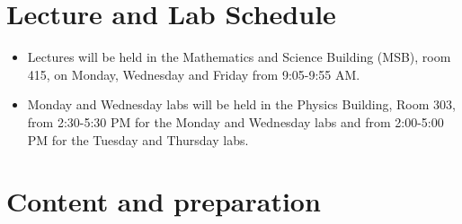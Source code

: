 \documentclass{revtex4}
\begin{document}
\section{Lecture and Lab Schedule}

\begin{itemize}
\item
Lectures will be held in the Mathematics and Science Building (MSB), room 415,
on Monday, Wednesday and Friday from 9:05-9:55 AM.
\item
Monday and Wednesday labs will be held in the Physics Building, Room 303,
from 2:30-5:30 PM for the Monday and Wednesday labs and from 2:00-5:00 PM
for the Tuesday and Thursday labs.
\end{itemize}

\section{Content and preparation}
\end{document}
